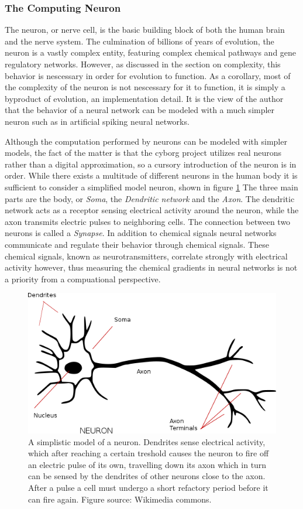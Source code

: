 \subsubsection{The Computing Neuron}
The neuron, or nerve cell, is the basic building block of both the human brain
and the nerve system.
The culmination of billions of years of evolution, the neuron is a vastly
complex entity, featuring complex chemical pathways and gene regulatory
networks.
However, as discussed in the section on complexity, this behavior is nescessary
in order for evolution to function.
As a corollary, most of the complexity of the neuron is not nescessary for it to
function, it is simply a byproduct of evolution, an implementation detail.
It is the view of the author that the behavior of a neural network can be
modeled with a much simpler neuron such as in artificial spiking neural
networks.\par
Although the computation performed by neurons can be modeled with simpler
models, the fact of the matter is that the cyborg project utilizes real neurons
rather than a digital approximation, so a cursory introduction of the neuron is
in order.
While there exists a multitude of different neurons in the human body it is
sufficient to consider a simplified model neuron, shown in figure \ref{figNeuron}
The three main parts are the body, or \emph{Soma}, the \emph{Dendritic
  network} and the \emph{Axon}. 
The dendritic network acts as a receptor sensing electrical activity around the
neuron, while the axon transmits electric pulses to neighboring cells.
The connection between two neurons is called a \emph{Synapse}.
%
In addition to chemical signals neural networks communicate and regulate their
behavior through chemical signals.
These chemical signals, known as neurotransmitters, correlate strongly with
electrical activity however, thus measuring the chemical gradients in neural
networks is not a priority from a compuational perspective.
\begin{figure}[h]
  \centering
  \includegraphics[width=1\textwidth]{fig/neuron.png}
  \caption[A model neuron]{
    A simplistic model of a neuron.
    Dendrites sense electrical activity, which after reaching a certain
    treshold causes the neuron to fire off an electric pulse of its own,
    travelling down its axon which in turn can be sensed by the dendrites of
    other neurons close to the axon.
    After a pulse a cell must undergo a short refactory period before it can
    fire again.
    Figure source: Wikimedia commons.
  }
  \label{figNeuron}
\end{figure}
